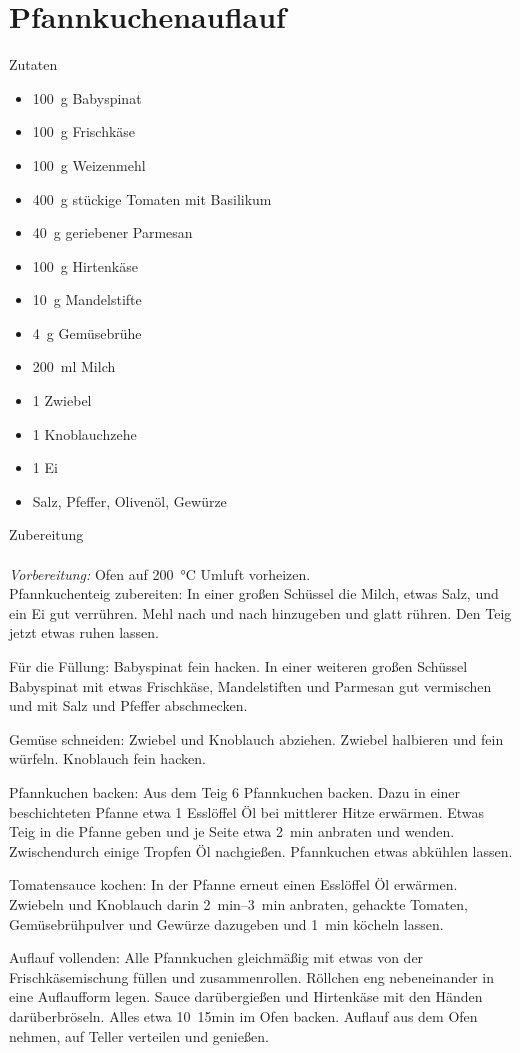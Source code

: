 \section*{Pfannkuchenauflauf}
\ihead{}\ohead{}
\cfoot{}
{\Large Zutaten}
\begin{multicols}{2}
\begin{itemize}
    \item \SI{100}{g} Babyspinat
    \item \SI{100}{g} Frischkäse
    \item \SI{100}{g} Weizenmehl
    \item \SI{400}{g} stückige Tomaten mit Basilikum
    \item \SI{40}{g} geriebener Parmesan
    \item \SI{100}{g} Hirtenkäse
    \item \SI{10}{g} Mandelstifte
    \item \SI{4}{g} Gemüsebrühe 
    \item \SI{200}{ml} Milch
    \item \num{1} Zwiebel
    \item \num{1} Knoblauchzehe
    \item \num{1} Ei
    \item Salz, Pfeffer, Olivenöl, Gewürze
\end{itemize}
\end{multicols}
\noindent
{\Large Zubereitung}\\
\\
\textit{Vorbereitung:} Ofen auf \SI{200}{\celsius} Umluft vorheizen.\\
Pfannkuchenteig zubereiten: In einer großen Schüssel die Milch, etwas Salz, und ein Ei gut verrühren. 
Mehl nach und nach hinzugeben und glatt rühren. 
Den Teig jetzt etwas ruhen lassen.

Für die Füllung: Babyspinat fein hacken. In einer weiteren großen Schüssel Babyspinat mit etwas Frischkäse, Mandelstiften und Parmesan gut vermischen und mit Salz und Pfeffer abschmecken.

Gemüse schneiden: Zwiebel und Knoblauch abziehen. Zwiebel halbieren und fein würfeln. 
Knoblauch fein hacken. 

Pfannkuchen backen: Aus dem Teig \num{6} Pfannkuchen backen. 
Dazu in einer beschichteten Pfanne etwa \num{1} Esslöffel Öl bei mittlerer Hitze erwärmen. 
Etwas Teig in die Pfanne geben und je Seite etwa \SI{2}{min} anbraten und wenden.
Zwischendurch einige Tropfen Öl nachgießen.
Pfannkuchen etwas abkühlen lassen.

Tomatensauce kochen: In der Pfanne erneut einen Esslöffel Öl erwärmen. 
Zwiebeln und Knoblauch darin \SIrange{2}{3}{min} anbraten, gehackte Tomaten, Gemüsebrühpulver und Gewürze dazugeben und \SI{1}{min} köcheln lassen.

Auflauf vollenden: Alle Pfannkuchen gleichmäßig mit etwas von der Frischkäsemischung füllen und zusammenrollen. 
Röllchen eng nebeneinander in eine Auflaufform legen.
Sauce darübergießen und Hirtenkäse mit den Händen darüberbröseln. 
Alles etwa \SI{10}{15}{min} im Ofen backen. 
Auflauf aus dem Ofen nehmen, auf Teller verteilen und genießen. 
